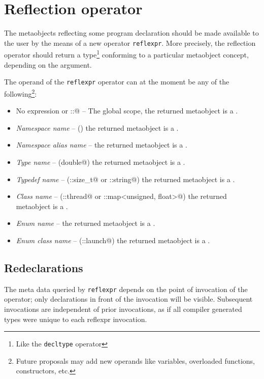 \section{Reflection operator}
\label{section-reflection-operator}

The metaobjects reflecting some program declaration \verb@X@ 
should be made available to the user by
the means of a new operator \texttt{reflexpr}.
More precisely, the reflection operator should return
a type\footnote{Like the \texttt{decltype} operator} conforming to a particular
metaobject concept, depending on the argument.

The operand \verb@X@ of the \texttt{reflexpr} operator can at the moment
be any of the following\footnote{Future proposals may add new operands
like variables, overloaded functions, constructors, etc.}:

\begin{itemize}
\item{No expression or \verb@::@} -- The global scope, the returned metaobject is a {}.
\item{{\em Namespace name}} -- (\verb@std@) the returned metaobject is a {}.
\item{{\em Namespace alias name}} -- the returned metaobject is a {}.
\item{{\em Type name}} -- (\verb@long double@) the returned metaobject is a {}.
\item{{\em Typedef name}} -- (\verb@std::size_t@ or \verb@std::string@)
     the returned metaobject is a {}.
\item{{\em Class name}} -- (\verb@std::thread@ or \verb@std::map<unsigned, float>@)
     the returned metaobject is a {}.
\item{{\em Enum name}} -- 
     the returned metaobject is a {}.
\item{{\em Enum class name}} -- (\verb@std::launch@)
     the returned metaobject is a {}.
\end{itemize}

\subsection{Redeclarations}

The meta data queried by \texttt{reflexpr} depends on the point of invocation
of the operator; only declarations in front of the invocation will be visible.
Subsequent invocations are independent of prior invocations, as if all compiler
generated types were unique to each reflexpr invocation.

